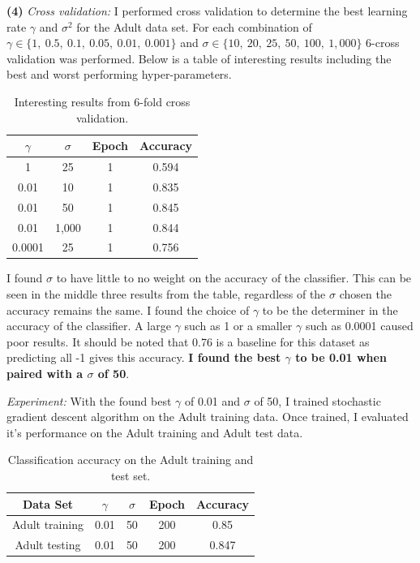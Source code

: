 \documentclass[11pt]{article}
\renewcommand\part[1]{\vspace{.10in}\textbf{(#1)}}
\begin{document}
\part{4} \textit{Cross validation:} I performed cross validation to determine the best learning rate $\gamma$ and $\sigma^2$ for the Adult data set. For each combination of $\gamma \in \{1, \ 0.5, \ 0.1, \ 0.05, \ 0.01, \ 0.001\}$ and $\sigma \in \{10, \ 20, \ 25, \ 50, \ 100, \ 1,000\}$ 6-cross validation was performed. Below is a table of interesting results including the best and worst performing hyper-parameters.

\begin{table}[H]
\centering
{\renewcommand{\arraystretch}{1.2}%
\begin{tabular}{| c | c | c | c |}
\hline
$\gamma$ & $\sigma$ & Epoch & Accuracy\\
\hline
1 & 25 & 1 & 0.594\\ \hline
0.01 & 10 & 1 & 0.835\\ \hline
0.01 & 50 & 1 & 0.845\\ \hline
0.01 & 1,000 & 1 & 0.844\\ \hline
0.0001 & 25 & 1 & 0.756\\ \hline
\end{tabular}}
\caption{Interesting results from 6-fold cross validation.}
\end{table}

I found $\sigma$ to have little to no weight on the accuracy of the classifier. This can be seen in the middle three results from the table, regardless of the $\sigma$ chosen the accuracy remains the same. I found the choice of $\gamma$ to be the determiner in the accuracy of the classifier. A large $\gamma$ such as 1 or a smaller $\gamma$ such as 0.0001 caused poor results. It should be noted that 0.76 is a baseline for this dataset as predicting all -1 gives this accuracy. \textbf{I found the best $\gamma$ to be 0.01 when paired with a $\sigma$ of 50}.

\textit{Experiment:} With the found best $\gamma$ of 0.01 and $\sigma$ of 50, I trained stochastic gradient descent algorithm on the Adult training data. Once trained, I evaluated it's performance on the Adult training and Adult test data.

\begin{table}[H]
\centering
{\renewcommand{\arraystretch}{1.2}%
\begin{tabular}{| c | c | c | c | c |}
\hline
Data Set & $\gamma$ & $\sigma$ & Epoch & Accuracy\\
\hline
Adult training & 0.01 & 50 & 200 & 0.85\\ \hline
Adult testing & 0.01 & 50 & 200 & 0.847\\ \hline
\end{tabular}}
\caption{Classification accuracy on the Adult training and test set.}
\end{table}
\end{document}
